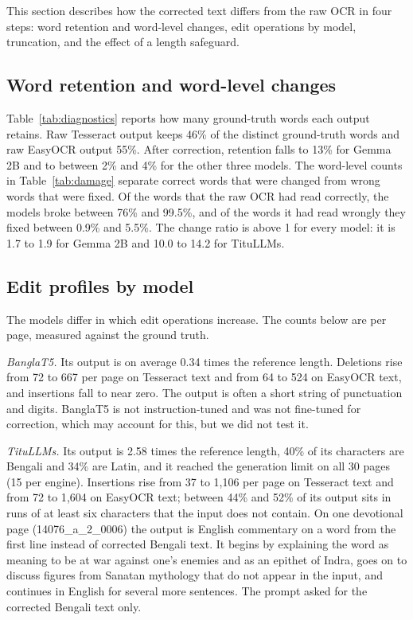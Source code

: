 \documentclass[conference]{IEEEtran}
\begin{document}
This section describes how the corrected text differs from the raw OCR in four steps: word retention and word-level changes, edit operations by model, truncation, and the effect of a length safeguard.

\subsection{Word retention and word-level changes}
Table~\ref{tab:diagnostics} reports how many ground-truth words each output retains. Raw Tesseract output keeps 46\% of the distinct ground-truth words and raw EasyOCR output 55\%. After correction, retention falls to 13\% for Gemma 2B and to between 2\% and 4\% for the other three models. The word-level counts in Table~\ref{tab:damage} separate correct words that were changed from wrong words that were fixed. Of the words that the raw OCR had read correctly, the models broke between 76\% and 99.5\%, and of the words it had read wrongly they fixed between 0.9\% and 5.5\%. The change ratio is above 1 for every model: it is 1.7 to 1.9 for Gemma 2B and 10.0 to 14.2 for TituLLMs.





\subsection{Edit profiles by model}
The models differ in which edit operations increase. The counts below are per page, measured against the ground truth.

\emph{BanglaT5.} Its output is on average 0.34 times the reference length. Deletions rise from 72 to 667 per page on Tesseract text and from 64 to 524 on EasyOCR text, and insertions fall to near zero. The output is often a short string of punctuation and digits. BanglaT5 is not instruction-tuned and was not fine-tuned for correction, which may account for this, but we did not test it.

\emph{TituLLMs.} Its output is 2.58 times the reference length, 40\% of its characters are Bengali and 34\% are Latin, and it reached the generation limit on all 30 pages (15 per engine). Insertions rise from 37 to 1{,}106 per page on Tesseract text and from 72 to 1{,}604 on EasyOCR text; between 44\% and 52\% of its output sits in runs of at least six characters that the input does not contain. On one devotional page (14076\_a\_2\_0006) the output is English commentary on a word from the first line instead of corrected Bengali text. It begins by explaining the word as meaning to be at war against one's enemies and as an epithet of Indra, goes on to discuss figures from Sanatan mythology that do not appear in the input, and continues in English for several more sentences. The prompt asked for the corrected Bengali text only.
\end{document}
